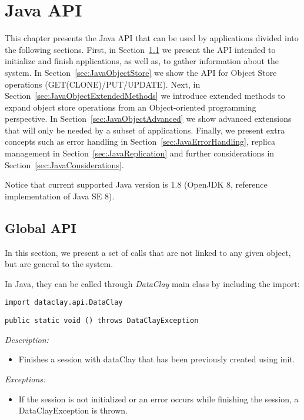 
\chapter{Java API}
\label{sec:JavaAPI}

This chapter presents the Java API that can be used by applications divided into the following sections. First, in Section~\ref{sec:JavaGlobalAPI} we present the API intended to initialize and finish applications, as well as, to gather information about the system. In Section~\ref{sec:JavaObjectStore} we show the API for Object Store operations (GET(CLONE)/PUT/UPDATE). Next, in Section~\ref{sec:JavaObjectExtendedMethods} we introduce extended methods to expand object store operations from an Object-oriented programming perspective. In Section~\ref{sec:JavaObjectAdvanced} we show advanced extensions that will only be needed by a subset of applications. Finally, we present extra concepts such as error handling in Section~\ref{sec:JavaErrorHandling}, replica management in Section~\ref{sec:JavaReplication} and further considerations in Section~\ref{sec:JavaConsiderations}.

Notice that current supported Java version is 1.8 (OpenJDK 8, reference implementation of Java SE 8).

\section{Global API}
\label{sec:JavaGlobalAPI}

In this section, we present a set of calls that are not linked to any given object, but are general to the system.

In Java, they can be called through \textit{DataClay} main class by including the import:

\colorbox{basecolor!20}{\texttt{import dataclay.api.DataClay}}



\begin{dBox}
\texttt{public static void () throws DataClayException}
\LINE

{\it Description:}

\begin{itemize}
    \item Finishes a session with dataClay that has been previously created using init.
\end{itemize}

{\it Exceptions:}

\begin{itemize}
    \item If the session is not initialized or an error occurs while finishing the session, a DataClayException is thrown.
\end{itemize}
 
\end{dBox}


